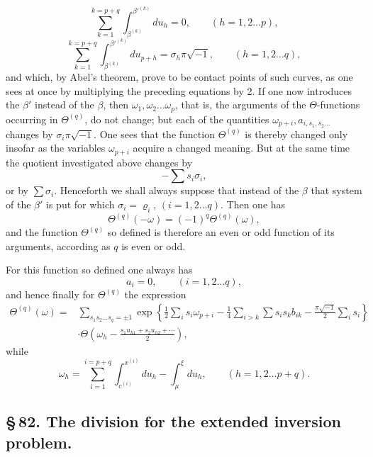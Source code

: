\documentclass[10pt]{article}
\begin{document}
\[
\sum_{k=1}^{k=p+q}\int_{\beta^{(k)}}^{\beta'^{(k)}}du_h=0,
\qquad (h=1,2\ldots p),
\]
\[
\sum_{k=1}^{k=p+q}\int_{\beta^{(k)}}^{\beta'^{(k)}}du_{p+h}=\sigma_h\pi\sqrt{-1},
\qquad (h=1,2\ldots q),
\]
and which, by Abel's theorem, prove to be contact points of such curves, as one sees at once by multiplying the preceding equations by 2. If one now introduces the \(\beta'\) instead of the \(\beta\), then \(\omega_1,\omega_2\ldots\omega_p\), that is, the arguments of the \(\Theta\)-functions occurring in \(\Theta^{(q)}\), do not change; but each of the quantities \(\omega_{p+i},a_{i,s_1,s_2\ldots}\) changes by \(\sigma_i\pi\sqrt{-1}\). One sees that the function \(\Theta^{(q)}\) is thereby changed only insofar as the variables \(\omega_{p+i}\) acquire a changed meaning. But at the same time the quotient investigated above changes by
\[
-\sum s_i\sigma_i,
\]
or by \(\sum\sigma_i\). Henceforth we shall always suppose that instead of the \(\beta\) that system of the \(\beta'\) is put for which \(\sigma_i=\varrho_i\), \((i=1,2\ldots q)\). Then one has
\[
\Theta^{(q)}(-\omega)=(-1)^q\Theta^{(q)}(\omega),
\]
and the function \(\Theta^{(q)}\) so defined is therefore an even or odd function of its arguments, according as \(q\) is even or odd.

For this function so defined one always has
\[
a_i=0,
\qquad (i=1,2\ldots q),
\]
and hence finally for \(\Theta^{(q)}\) the expression
\[
\begin{aligned}
\Theta^{(q)}(\omega)={}&
\sum_{s_1s_2\ldots s_q=\pm1}
\exp\!\left\{\frac12\sum_i s_i\omega_{p+i}
-\frac14\sum_{i>k}\sum s_i s_k b_{ik}
-\frac{\pi\sqrt{-1}}{2}\sum_i s_i\right\}\\
&\cdot\Theta\!\left(\omega_h-\frac{s_1u_{h1}+s_2u_{h2}+\cdots}{2}\right),
\end{aligned}
\]
while
\[
\omega_h=\sum_{i=1}^{i=p+q}\int_{c^{(i)}}^{x^{(i)}}du_h-\int_{\mu}^{\xi}du_h,
\qquad (h=1,2\ldots p+q).
\]

\subsection*{\S\,82. The division for the extended inversion problem.}
\end{document}
